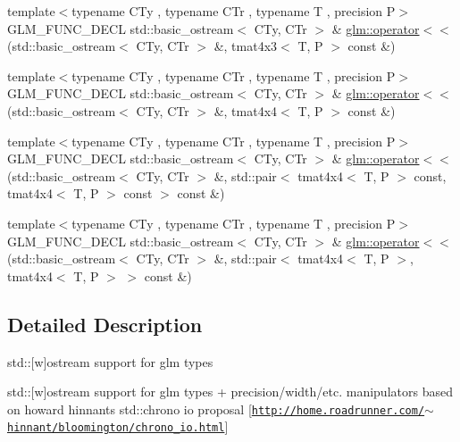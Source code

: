 \begin{DoxyCompactItemize}
\item 
{\footnotesize template$<$typename C\+Ty , typename C\+Tr , typename T , precision P$>$ }\\G\+L\+M\+\_\+\+F\+U\+N\+C\+\_\+\+D\+E\+C\+L std\+::basic\+\_\+ostream$<$ C\+Ty, C\+Tr $>$ \& \hyperlink{group__gtx__io_gaca75b14a0534a02860349a114a10aa44}{glm\+::operator$<$$<$} (std\+::basic\+\_\+ostream$<$ C\+Ty, C\+Tr $>$ \&, tmat4x3$<$ T, P $>$ const \&)
\item 
{\footnotesize template$<$typename C\+Ty , typename C\+Tr , typename T , precision P$>$ }\\G\+L\+M\+\_\+\+F\+U\+N\+C\+\_\+\+D\+E\+C\+L std\+::basic\+\_\+ostream$<$ C\+Ty, C\+Tr $>$ \& \hyperlink{group__gtx__io_ga6683acc91ba7ce5822e25a2517550bff}{glm\+::operator$<$$<$} (std\+::basic\+\_\+ostream$<$ C\+Ty, C\+Tr $>$ \&, tmat4x4$<$ T, P $>$ const \&)
\item 
{\footnotesize template$<$typename C\+Ty , typename C\+Tr , typename T , precision P$>$ }\\G\+L\+M\+\_\+\+F\+U\+N\+C\+\_\+\+D\+E\+C\+L std\+::basic\+\_\+ostream$<$ C\+Ty, C\+Tr $>$ \& \hyperlink{group__gtx__io_ga112ff562e10c18929151d17e711e27a7}{glm\+::operator$<$$<$} (std\+::basic\+\_\+ostream$<$ C\+Ty, C\+Tr $>$ \&, std\+::pair$<$ tmat4x4$<$ T, P $>$ const, tmat4x4$<$ T, P $>$ const  $>$ const \&)
\item 
{\footnotesize template$<$typename C\+Ty , typename C\+Tr , typename T , precision P$>$ }\\G\+L\+M\+\_\+\+F\+U\+N\+C\+\_\+\+D\+E\+C\+L std\+::basic\+\_\+ostream$<$ C\+Ty, C\+Tr $>$ \& \hyperlink{group__gtx__io_gad09c7114641975d778243bd4379a3ea5}{glm\+::operator$<$$<$} (std\+::basic\+\_\+ostream$<$ C\+Ty, C\+Tr $>$ \&, std\+::pair$<$ tmat4x4$<$ T, P $>$, tmat4x4$<$ T, P $>$ $>$ const \&)
\end{DoxyCompactItemize}


\subsection{Detailed Description}
std\+:\+:\mbox{[}w\mbox{]}ostream support for glm types 

std\+:\+:\mbox{[}w\mbox{]}ostream support for glm types + precision/width/etc. manipulators based on howard hinnant\textquotesingle{}s std\+::chrono io proposal \mbox{[}\href{http://home.roadrunner.com/~hinnant/bloomington/chrono_io.html}{\tt http\+://home.\+roadrunner.\+com/$\sim$hinnant/bloomington/chrono\+\_\+io.\+html}\mbox{]}

